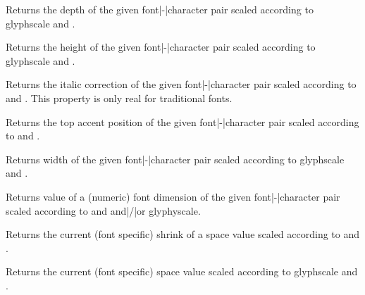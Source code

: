 \startnewprimitive[title={\prm {scaledfontchardp}}]

Returns the depth of the given font|-|character pair scaled according to \prm
{glyphscale} and .

\stopnewprimitive

\startnewprimitive[title={\prm {scaledfontcharht}}]

Returns the height of the given font|-|character pair scaled according to \prm
{glyphscale} and .

\stopnewprimitive

\startnewprimitive[title={\prm {scaledfontcharic}}]

Returns the italic correction of the given font|-|character pair scaled according
to  and . This property is only real for
traditional fonts.

\stopnewprimitive

\startnewprimitive[title={\prm {scaledfontcharta}}]

Returns the top accent position of the given font|-|character pair scaled
according to  and .

\stopnewprimitive

\startnewprimitive[title={\prm {scaledfontcharwd}}]

Returns width of the given font|-|character pair scaled according to \prm
{glyphscale} and .

\stopnewprimitive

\startnewprimitive[title={\prm {scaledfontdimen}}]

Returns value of a (numeric) font dimension of the given font|-|character pair
scaled according to  and  and|/|or \prm
{glyphyscale}.

\stopnewprimitive

\startnewprimitive[title={\prm {scaledinterwordshrink}}]

Returns the current (font specific) shrink of a space value scaled according to
 and .

\stopnewprimitive

\startnewprimitive[title={\prm {scaledinterwordspace}}]

Returns the current (font specific) space value scaled according to \prm
{glyphscale} and .

\stopnewprimitive

